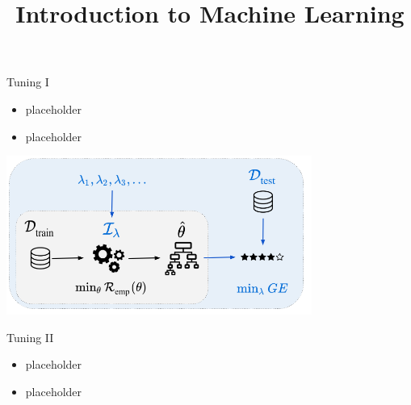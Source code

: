 \documentclass[11pt,compress,t,notes=noshow, xcolor=table]{beamer}
\title{Introduction to Machine Learning}
\date{}
\begin{document}
	
	\sloppy
	
	\begin{vbframe}{Tuning I}
		\begin{itemize}
			\item \small placeholder
			\item \small placeholder
		\end{itemize}
		
				\begin{center}
					\includegraphics[width = 0.75\textwidth]{figure_man/riskmin_bilevel3}
				\end{center}
		
	\end{vbframe}
	
	\begin{vbframe}{Tuning II}
		\begin{itemize}
			\item \small placeholder
			\item \small placeholder
		\end{itemize}
	\end{vbframe}
	
	
	\endlecture
\end{document}
